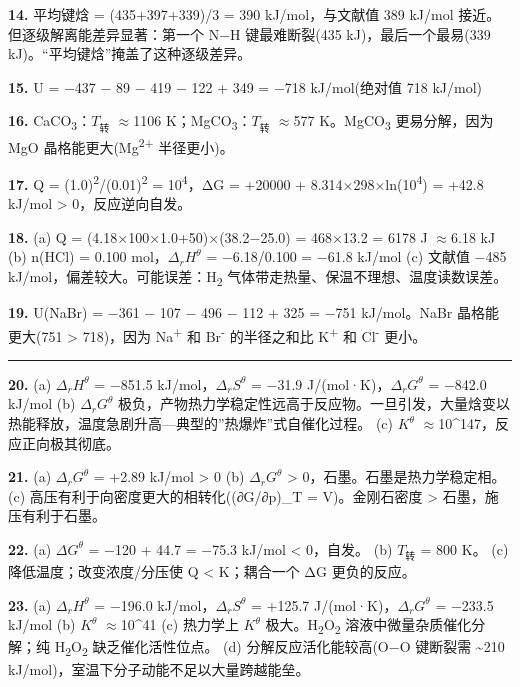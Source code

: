 \documentclass[a4paper,11pt]{ctexart}
\newcommand{\箭}{\ensuremath{\rightarrow}}
\newcommand{\左箭}{\ensuremath{\leftarrow}}
\newcommand{\上箭}{\ensuremath{\uparrow}}
\newcommand{\下箭}{\ensuremath{\downarrow}}
\newcommand{\衡}{\ensuremath{\rightleftharpoons}}
\newcommand{\双箭}{\ensuremath{\leftrightarrow}}
\newcommand{\约等于}{\ensuremath{\approx}}
\newcommand{\小于等于}{\ensuremath{\leq}}
\newcommand{\大于等于}{\ensuremath{\geq}}
\newcommand{\不等于}{\ensuremath{\neq}}
\newcommand{\西格马}{\ensuremath{\sigma}}
\newcommand{\派}{\ensuremath{\pi}}
\begin{document}
\textbf{14.} 平均键焓 = (435+397+339)/3 = 390 kJ/mol，与文献值 389 kJ/mol 接近。但逐级解离能差异显著：第一个 N−H 键最难断裂(435 kJ)，最后一个最易(339 kJ)。``平均键焓''掩盖了这种逐级差异。

\textbf{15.} U = −437 − 89 − 419 − 122 + 349 = −718 kJ/mol(绝对值 718 kJ/mol)

\textbf{16.} CaCO\textsubscript{3}：\(T_{转}\) \约等于 1106 K；MgCO\textsubscript{3}：\(T_{转}\) \约等于 577 K。MgCO\textsubscript{3} 更易分解，因为 MgO 晶格能更大(Mg\textsuperscript{2+} 半径更小)。

\textbf{17.} Q = (1.0)\textsuperscript{2}/(0.01)\textsuperscript{2} = 10\textsuperscript{4}，ΔG = +20000 + 8.314×298×ln(10\textsuperscript{4}) = +42.8 kJ/mol \textgreater{} 0，反应逆向自发。

\textbf{18.}
(a) Q = (4.18×100×1.0+50)×(38.2−25.0) = 468×13.2 = 6178 J \约等于 6.18 kJ
(b) n(HCl) = 0.100 mol，\(\Delta_r H^\theta\) = −6.18/0.100 = −61.8 kJ/mol
(c) 文献值 −485 kJ/mol，偏差较大。可能误差：H\textsubscript{2} 气体带走热量、保温不理想、温度读数误差。

\textbf{19.} U(NaBr) = −361 − 107 − 496 − 112 + 325 = −751 kJ/mol。NaBr 晶格能更大(751 \textgreater{} 718)，因为 Na\textsuperscript{+} 和 Br\textsuperscript{-} 的半径之和比 K\textsuperscript{+} 和 Cl\textsuperscript{-} 更小。

\begin{center}\rule{0.5\linewidth}{0.5pt}\end{center}

\textbf{20.}
(a) \(\Delta_r H^\theta\) = −851.5 kJ/mol，\(\Delta_r S^\theta\) = −31.9 J/(mol·K)，\(\Delta_r G^\theta\) = −842.0 kJ/mol
(b) \(\Delta_r G^\theta\) 极负，产物热力学稳定性远高于反应物。一旦引发，大量焓变以热能释放，温度急剧升高---典型的''热爆炸''式自催化过程。
(c) \(K^\theta\) \约等于 10\^{}147，反应正向极其彻底。

\textbf{21.}
(a) \(\Delta_r G^\theta\) = +2.89 kJ/mol \textgreater{} 0
(b) \(\Delta_r G^\theta\) \textgreater{} 0，石墨。石墨是热力学稳定相。
(c) 高压有利于向密度更大的相转化((∂G/∂p)\_T = V)。金刚石密度 \textgreater{} 石墨，施压有利于石墨。

\textbf{22.}
(a) \(\Delta G^\theta\) = −120 + 44.7 = −75.3 kJ/mol \textless{} 0，自发。
(b) \(T_{转}\) = 800 K。
(c) 降低温度；改变浓度/分压使 Q \textless{} K；耦合一个 ΔG 更负的反应。

\textbf{23.}
(a) \(\Delta_r H^\theta\) = −196.0 kJ/mol，\(\Delta_r S^\theta\) = +125.7 J/(mol·K)，\(\Delta_r G^\theta\) = −233.5 kJ/mol
(b) \(K^\theta\) \约等于 10\^{}41
(c) 热力学上 \(K^\theta\) 极大。H\textsubscript{2}O\textsubscript{2} 溶液中微量杂质催化分解；纯 H\textsubscript{2}O\textsubscript{2} 缺乏催化活性位点。
(d) 分解反应活化能较高(O−O 键断裂需 \textasciitilde210 kJ/mol)，室温下分子动能不足以大量跨越能垒。
\end{document}
